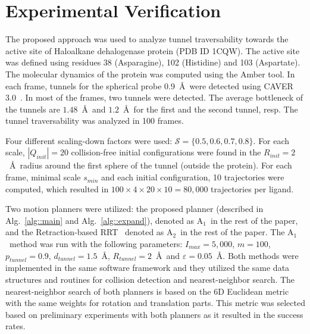 \documentclass[usletter, 10pt, conference]{ieeeconf} %
\def\dt{d_{tunnel}}
\def\QI{Q_{init}}
\def\RI{R_{init}}
\def\rv{R_{tunnel}}
\def\Imax{I_{max}} %
\def\smin{s_{min}}
\def\gb{p_{tunnel}}
\def\S{\mathcal{S}}
\def\RA{A$_{1}$}
\def\RB{A$_{2}$}
\begin{document}
\section{Experimental Verification}


The proposed approach was used to analyze tunnel traversability towards the active site of Haloalkane dehalogenase protein (PDB ID 1CQW).
The active site was defined using residues 38 (Asparagine), 102 (Histidine) and 103 (Aspartate).
The molecular dynamics of the protein was computed using the Amber tool.
In each frame, tunnels for the spherical probe 0.9~\AA\ were detected using CAVER 3.0~\cite{caver3}. 
In most of the frames, two tunnels were detected.
The average bottleneck of the tunnels are $1.48$~\AA\ and $1.2$~\AA\ for the first and the second tunnel, resp.
The tunnel traversability was analyzed in 100 frames.

Four different scaling-down factors were used: $\S=\{0.5,0.6,0.7,0.8\}$.
For each scale, $|\QI|=20$ collision-free initial configurations were found in the $\RI=2$~\AA\ radius around the first sphere of the tunnel (outside the protein).
For each frame, minimal scale $\smin$ and each initial configuration, 10 trajectories were computed, which resulted
in $100 \times 4 \times 20 \times 10 = 80,000$ trajectories per ligand.

Two motion planners were utilized: the proposed planner (described in Alg.~\ref{alg::main} and Alg.~\ref{alg::expand}), 
    denoted as \RA\ in the rest of the paper, and the Retraction-based RRT~\cite{zhangRetraction} denoted as \RB\ in the rest of the paper.
The \RA\ method was run with the following parameters:
$\Imax=5,000$, $m=100$, $\gb=0.9$, $\dt=1.5$~\AA, $\rv=2$~\AA\ and $\varepsilon=0.05$~\AA.
Both methods were implemented in the same software framework and they utilized the same data structures and routines for collision detection and nearest-neighbor search.
The nearest-neighbor search of both planners is based on the 6D Euclidean metric with the same weights for rotation and translation parts.
This metric was selected based on preliminary experiments with both planners as it resulted in the success rates.
\end{document}
